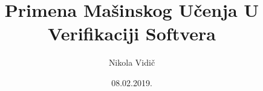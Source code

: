 \documentclass[14pt]{beamer}
\title[]{Primena Mašinskog Učenja U Verifikaciji Softvera} %
\author{Nikola Vidič} %
\institute[Matematički fakultet] %
{
Matematički fakultet \\ %
\medskip
}
\date{08.02.2019.} %
\begin{document}
\begin{frame}
\titlepage %
\end{frame}






\end{document}
